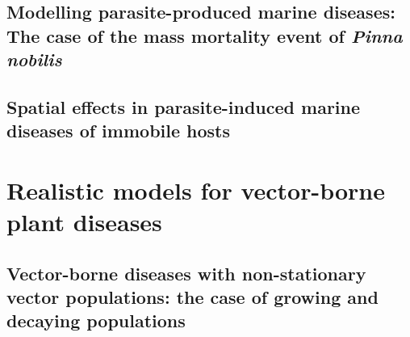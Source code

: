 \documentclass[
	10pt, %
	fleqn, %
	a4paper, %
]{LegrandOrangeBook}
\begin{document}
\chapter{Modelling parasite-produced marine diseases: The case of the mass
  mortality event of \textit{Pinna nobilis}}


\chapterspaceabove{6.75cm}
\chapterspacebelow{7.25cm}

\chapter{Spatial effects in parasite-induced marine diseases of immobile hosts}



\part{Realistic models for vector-borne plant diseases}

\chapterspaceabove{6.75cm}
\chapterspacebelow{7.25cm}

\chapter{Vector-borne diseases with non-stationary vector populations: the case
  of growing and decaying populations}


\chapterspaceabove{6.75cm}
\chapterspacebelow{7.25cm}
\end{document}
